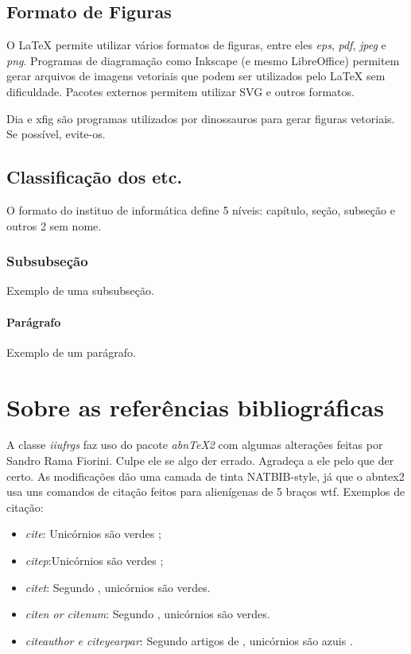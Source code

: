 \documentclass[cic,tc,english]{iiufrgs}
\begin{document}
\subsection{Formato de Figuras}
\label{sec:fig_format}

O LaTeX permite utilizar vários formatos de figuras, entre eles \emph{eps}, \emph{pdf}, \emph{jpeg} e \emph{png}. Programas de diagramação como Inkscape (e mesmo LibreOffice) permitem gerar arquivos de imagens vetoriais que podem ser utilizados pelo LaTeX sem dificuldade. Pacotes externos permitem utilizar SVG e outros formatos.

Dia e xfig são programas utilizados por dinossauros para gerar figuras vetoriais. Se possível, evite-os.

\subsection{Classificação dos etc.}

O formato do instituo de informática define 5 níveis: capítulo, seção, subseção e outros 2 sem nome.

\subsubsection{Subsubseção}
Exemplo de uma subsubseção.

\paragraph{Parágrafo}
Exemplo de um parágrafo.

\section{Sobre as referências bibliográficas}

A classe \emph{iiufrgs} faz uso do pacote \emph{abnTeX2} com algumas alterações
feitas por Sandro Rama Fiorini. Culpe ele se algo der errado. Agradeça a ele
pelo que der certo. As modificações dão uma camada de tinta NATBIB-style,
já que o abntex2 usa uns comandos de citação feitos para alienígenas de 5 braços
wtf. Exemplos de citação:

\begin{itemize}
    \item \emph{cite}: Unicórnios são verdes \cite{Adams2009Conceptual};
    \item \emph{citep}:Unicórnios são verdes \citep{Adams2009Conceptual};
    \item \emph{citet}: Segundo \citet{Adams2009Conceptual}, unicórnios são
    verdes.
    \item \emph{citen or citenum}: Segundo ,
    unicórnios são verdes.
    \item \emph{citeauthor e citeyearpar}: Segundo artigos de
    \citeauthor{Adams2009Conceptual} , unicórnios são azuis
    \citeyearpar{Adams2009Conceptual}.

\end{itemize}
\end{document}
